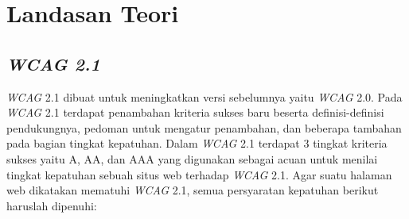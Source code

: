 \setcounter{secnumdepth}{3}

\chapter{Landasan Teori}
\label{chap:teori}

\section{\textit{WCAG 2.1} \cite{WCAG:2.1}}
\label{sec:wcag_2.1}  
\textit{WCAG} 2.1 dibuat untuk meningkatkan versi sebelumnya yaitu \textit{WCAG} 2.0. Pada \textit{WCAG} 2.1 terdapat penambahan kriteria sukses baru beserta definisi-definisi pendukungnya, pedoman untuk mengatur penambahan, dan beberapa tambahan pada bagian tingkat kepatuhan. Dalam \textit{WCAG} 2.1 terdapat 3 tingkat kriteria sukses yaitu A, AA, dan AAA yang digunakan sebagai acuan untuk menilai tingkat kepatuhan sebuah situs web terhadap \textit{WCAG} 2.1. Agar suatu halaman web dikatakan mematuhi \textit{WCAG} 2.1, semua persyaratan kepatuhan berikut haruslah dipenuhi:
